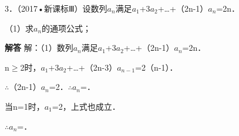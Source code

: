 3．（2017•新课标Ⅲ）设数列{\ensuremath{a_{n}}}满足\ensuremath{a_{1}}+3\ensuremath{a_{2}}+\ldots{}+（2n-1）\ensuremath{a_{n}}=2n．\par
（1）求{\ensuremath{a_{n}}}的通项公式；\par
\QuestionSpace{3.5cm}
\ifshowanswers
\par\begingroup\color{solutioncolor}\noindent\textbf{解答}\quad
解：（1）数列{\ensuremath{a_{n}}}满足\ensuremath{a_{1}}+3\ensuremath{a_{2}}+\ldots{}+（2n-1）\ensuremath{a_{n}}=2n．\par
n\ensuremath{\ge}2时，\ensuremath{a_{1}}+3\ensuremath{a_{2}}+\ldots{}+（2n-3）\ensuremath{a_{n-1}}=2（n-1）．\par
\ensuremath{\therefore}（2n-1）\ensuremath{a_{n}}=2．\ensuremath{\therefore}\ensuremath{a_{n}}=．\par
当n=1时，\ensuremath{a_{1}}=2，上式也成立．\par
\ensuremath{\therefore}\ensuremath{a_{n}}=．\par
\par\endgroup\fi

